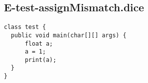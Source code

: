 \subsection{E-test-assignMismatch.dice}
\begin{verbatim}
class test {
  public void main(char[][] args) {
      float a;
      a = 1;
      print(a);
  }
}
\end{verbatim}